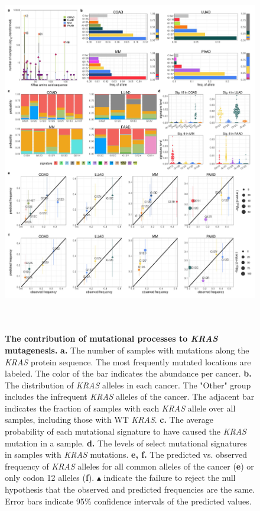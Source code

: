 \documentclass[english, 10pt, letterpaper]{article}
\newcommand{\KRAS}{\emph{KRAS}}
\begin{document}
\begin{figure}[p]
\centering
\includegraphics[height=160mm]{figures/Figure_01.jpeg}
\caption{
    \textbf{The contribution of mutational processes to \KRAS{} mutagenesis.}
    \textbf{a.} The number of samples with mutations along the \KRAS{} protein sequence. The most frequently mutated locations are labeled. The color of the bar indicates the abundance per cancer. 
    \textbf{b.} The distribution of \KRAS{} alleles in each cancer. The "Other" group includes the infrequent \KRAS{} alleles of the cancer. The adjacent bar indicates the fraction of samples with each \KRAS{} allele over all samples, including those with WT \KRAS{}.
    \textbf{c.} The average probability of each mutational signature to have caused the \KRAS{} mutation in a sample.
    \textbf{d.} The levels of select mutational signatures in samples with \KRAS{} mutations.
    \textbf{e, f.} The predicted vs. observed frequency of \KRAS{} alleles for all common alleles of the cancer (\textbf{e}) or only codon 12 alleles (\textbf{f}). $\blacktriangle$ indicate the failure to reject the null hypothesis that the observed and predicted frequencies are the same. Error bars indicate 95\% confidence intervals of the predicted values.
}
\label{fig:mutational-signatures-main}
\end{figure}
\end{document}
